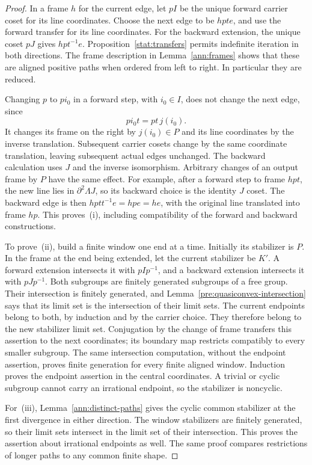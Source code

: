 \begin{proof}
In a frame $h$ for the current edge, let $pI$ be the unique forward
carrier coset for its line coordinates.  Choose the next edge to be
$hpt e$, and use the forward transfer for its line coordinates.  For
the backward extension, the unique coset $pJ$ gives $hpt^{-1}e$.
Proposition~\ref{stat:transfers} permits indefinite iteration in
both directions.  The frame description in Lemma~\ref{ann:frames}
shows that these are aligned positive paths when ordered from left
to right.  In particular they are reduced.

Changing $p$ to $pi_0$ in a forward step, with $i_0\in I$, does not
change the next edge, since
\[
                       pi_0t=pt\,j(i_0).
\]
It changes its frame on the right by $j(i_0)\in P$ and its line
coordinates by the inverse translation.  Subsequent carrier cosets
change by the same coordinate translation, leaving subsequent
actual edges unchanged.  The backward calculation uses $J$ and the
inverse isomorphism.  Arbitrary changes of an output frame by $P$
have the same effect.  For example, after a forward step to frame
$hpt$, the new line lies in $\partial^2\Lambda J$, so its backward
choice is the identity $J$ coset.  The backward edge is then
$hptt^{-1}e=hpe=he$, with the original line translated into frame
$hp$.  This proves~(i), including compatibility of the forward and
backward constructions.

To prove~(ii), build a finite window one end at a time.  Initially
its stabilizer is $P$.  In the frame at the end being extended, let
the current stabilizer be $K'$.  A forward extension intersects it
with $pIp^{-1}$, and a backward extension intersects it with
$pJp^{-1}$.  Both subgroups are finitely generated subgroups of a
free group.  Their intersection is finitely generated, and
Lemma~\ref{pre:quasiconvex-intersection} says that its limit set is
the intersection of their limit sets.  The current endpoints belong
to both, by induction and by the carrier choice.  They therefore
belong to the new stabilizer limit set.  Conjugation by the change of
frame transfers this assertion to the next coordinates; its
boundary map restricts compatibly to every smaller subgroup.
The same intersection computation, without the endpoint assertion,
proves finite generation for every finite aligned window.  Induction
proves the endpoint assertion in the central coordinates.  A
trivial or cyclic subgroup cannot carry an irrational endpoint, so
the stabilizer is noncyclic.

For~(iii), Lemma~\ref{ann:distinct-paths} gives the cyclic common
stabilizer at the first divergence in either direction.  The window
stabilizers are finitely generated, so
their limit sets intersect in the limit set of their intersection.
This proves the assertion about irrational endpoints as well.
The same proof compares restrictions of longer paths to any common
finite shape.


\end{proof}
